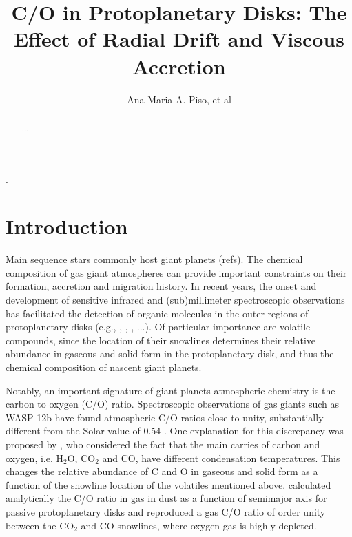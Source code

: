 \documentclass[apj]{emulateapj}
\newcommand{\emgr}[1]{\emph{ \color{gray} #1}}
\begin{document}



\title{C/O in Protoplanetary Disks: The Effect of Radial Drift and Viscous Accretion}

\author{Ana-Maria A. Piso, et al}. %


\begin{abstract}
...
\end{abstract}

\section{Introduction}


Main sequence stars commonly host giant planets (refs). The chemical composition of gas giant atmospheres can provide important constraints on their formation, accretion and migration history. In recent years, the onset and development of sensitive infrared and (sub)millimeter spectroscopic observations has facilitated the detection of organic molecules in the outer regions of protoplanetary disks (e.g., \citealt{oberg10}, \citealt{oberg11b}, \citealt{oberg11c}, ...). Of particular importance are volatile compounds, since the location of their snowlines determines their relative abundance in gaseous and solid form in the protoplanetary disk, and thus the chemical composition of nascent giant planets. 

Notably, an important signature of giant planets atmospheric chemistry is the carbon to oxygen (C/O) ratio. Spectroscopic observations of gas giants such as WASP-12b have found atmospheric C/O ratios close to unity, substantially different from the Solar value of 0.54 \citep{madhu11}. One explanation for this discrepancy was proposed by \citet{oberg11}, who considered the fact that the main carries of carbon and oxygen, i.e. H$_2$O, CO$_2$ and CO, have different condensation temperatures. This changes the relative abundance of C and O in gaseous and solid form as a function of the snowline location of the volatiles mentioned above. \citet{oberg11} calculated analytically the C/O ratio in gas in dust as a function of semimajor axis for passive protoplanetary disks and reproduced a gas C/O ratio of order unity between the CO$_2$ and CO snowlines, where oxygen gas is highly depleted.
\end{document}
